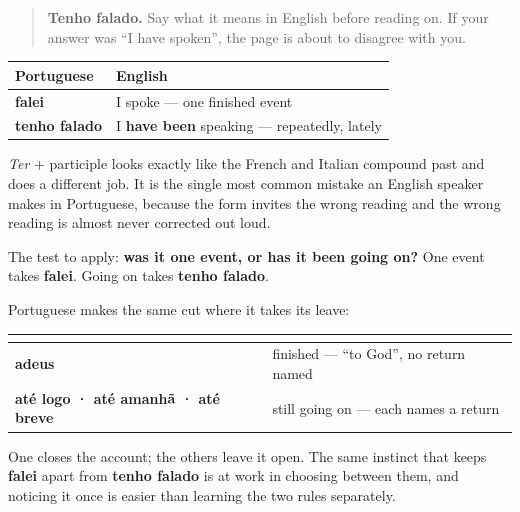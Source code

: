 \label{lesson:PT-C28-second-pass-finished-or-ongoing}



\begin{quote}
\textbf{Tenho falado.} Say what it means in English before reading on. If your answer was \textquotedblleft{}I have spoken\textquotedblright{}, the page is about to disagree with you.
\end{quote}

\begin{grammarlens}[title={Grammar Lens: the compound that means something else}]
\noindent
\begin{tabularx}{\linewidth}{@{}>{\raggedright\arraybackslash}X>{\raggedright\arraybackslash}X@{}}
\toprule
\textbf{Portuguese} & \textbf{English} \\
\midrule
\textbf{falei} & I spoke — one finished event \\
\textbf{tenho falado} & I \textbf{have been} speaking — repeatedly, lately \\
\bottomrule
\end{tabularx}

\emph{Ter} + participle looks exactly like the French and Italian compound past and does a different job. It is the single most common mistake an English speaker makes in Portuguese, because the form invites the wrong reading and the wrong reading is almost never corrected out loud.

The test to apply: \textbf{was it one event, or has it been going on?} One event takes \textbf{falei}. Going on takes \textbf{tenho falado}.
\end{grammarlens}

\begin{grammarlens}[title={What you've built — the goodbyes draw the same line}]
Portuguese makes the same cut where it takes its leave:

\noindent
\begin{tabularx}{\linewidth}{@{}>{\raggedright\arraybackslash}X>{\raggedright\arraybackslash}X@{}}
\toprule
\textbf{} & \textbf{} \\
\midrule
\textbf{adeus} & finished — \textquotedblleft{}to God\textquotedblright{}, no return named \\
\textbf{até logo · até amanhã · até breve} & still going on — each names a return \\
\bottomrule
\end{tabularx}

One closes the account; the others leave it open. The same instinct that keeps \textbf{falei} apart from \textbf{tenho falado} is at work in choosing between them, and noticing it once is easier than learning the two rules separately.
\end{grammarlens}

